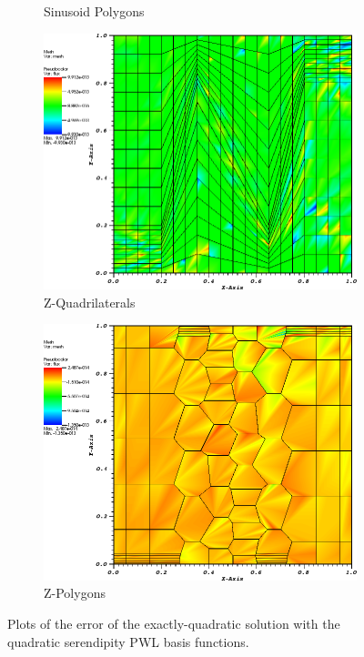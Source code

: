 \begin{figure}
{\begin{subfigure}[b]{0.465\textwidth}
		\caption{Sinusoid Polygons}
	\end{subfigure}
}
\vspace{3mm}
{
	\begin{subfigure}[b]{0.465\textwidth}
		\centering
		\label{subfig::z_quad_me_k2_lin_sol}
		\includegraphics[width=\textwidth]{figures/sec_BF/quad_err_zquad_PWL2.png}
		\caption{Z-Quadrilaterals}
	\end{subfigure}
	\hfill
	\begin{subfigure}[b]{0.465\textwidth}
		\centering
		\label{subfig::z_poly_me_k2_lin_sol}
		\includegraphics[width=\textwidth]{figures/sec_BF/quad_err_zpoly_PWL2.png}
		\caption{Z-Polygons}
	\end{subfigure}
}
\caption{Plots of the error of the exactly-quadratic solution with the quadratic serendipity PWL basis functions.}
\label{fig::BF_Results_quad_err_PWL2}
\end{figure}

